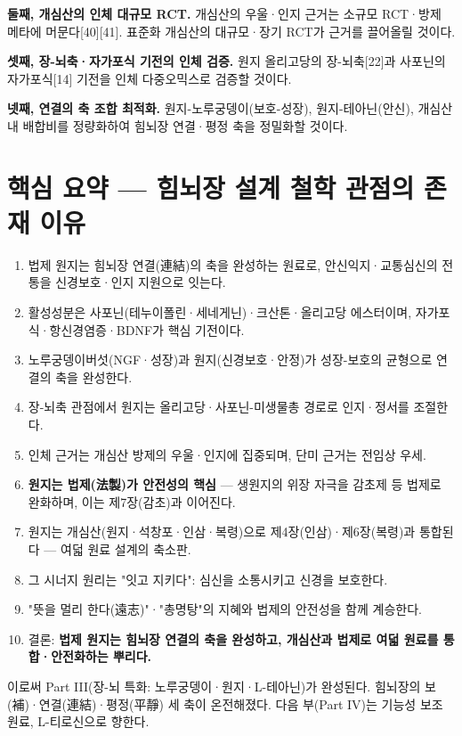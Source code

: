 \documentclass[11pt,oneside]{book}
\begin{document}
\textbf{둘째, 개심산의 인체 대규모 RCT.} 개심산의 우울·인지 근거는 소규모 RCT·방제 메타에 머문다[40][41]. 표준화 개심산의 대규모·장기 RCT가 근거를 끌어올릴 것이다.

\textbf{셋째, 장-뇌축·자가포식 기전의 인체 검증.} 원지 올리고당의 장-뇌축[22]과 사포닌의 자가포식[14] 기전을 인체 다중오믹스로 검증할 것이다.

\textbf{넷째, 연결의 축 조합 최적화.} 원지-노루궁뎅이(보호-성장), 원지-테아닌(안신), 개심산 내 배합비를 정량화하여 힘뇌장 연결·평정 축을 정밀화할 것이다.

\section{핵심 요약 — 힘뇌장 설계 철학 관점의 존재 이유}
\begin{enumerate}[leftmargin=6mm,itemsep=1pt,topsep=2pt]
  \item 법제 원지는 힘뇌장 연결(連結)의 축을 완성하는 원료로, 안신익지·교통심신의 전통을 신경보호·인지 지원으로 잇는다.
  \item 활성성분은 사포닌(테누이폴린·세네게닌)·크산톤·올리고당 에스터이며, 자가포식·항신경염증·BDNF가 핵심 기전이다.
  \item 노루궁뎅이버섯(NGF·성장)과 원지(신경보호·안정)가 성장-보호의 균형으로 연결의 축을 완성한다.
  \item 장-뇌축 관점에서 원지는 올리고당·사포닌-미생물총 경로로 인지·정서를 조절한다.
  \item 인체 근거는 개심산 방제의 우울·인지에 집중되며, 단미 근거는 전임상 우세.
  \item \textbf{원지는 법제(法製)가 안전성의 핵심} — 생원지의 위장 자극을 감초제 등 법제로 완화하며, 이는 제7장(감초)과 이어진다.
  \item 원지는 개심산(원지·석창포·인삼·복령)으로 제4장(인삼)·제6장(복령)과 통합된다 — 여덟 원료 설계의 축소판.
  \item 그 시너지 원리는 "잇고 지키다": 심신을 소통시키고 신경을 보호한다.
  \item "뜻을 멀리 한다(遠志)"·"총명탕"의 지혜와 법제의 안전성을 함께 계승한다.
  \item 결론: \textbf{법제 원지는 힘뇌장 연결의 축을 완성하고, 개심산과 법제로 여덟 원료를 통합·안전화하는 뿌리다.}
\end{enumerate}
이로써 Part III(장-뇌 특화: 노루궁뎅이·원지·L-테아닌)가 완성된다. 힘뇌장의 보(補)·연결(連結)·평정(平靜) 세 축이 온전해졌다. 다음 부(Part IV)는 기능성 보조 원료, L-티로신으로 향한다.
\end{document}

